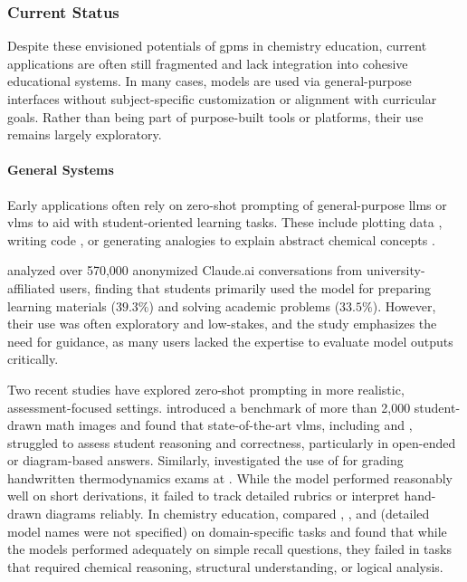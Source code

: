 \subsubsection{Current Status}

Despite these envisioned potentials of \glspl{gpm} in chemistry education, current applications are often still fragmented and lack integration into cohesive educational systems. 
In many cases, models are used via general-purpose interfaces without subject-specific customization or alignment with curricular goals. 
Rather than being part of purpose-built tools or platforms, their use remains largely exploratory.

\paragraph{General Systems}
Early applications often rely on zero-shot prompting of general-purpose \glspl{llm} or \glspl{vlm} to aid with student-oriented learning tasks. 
These include plotting data \autocite{Subasinghe2025}, writing code \autocite{Tsai2023}, or generating analogies to explain abstract chemical concepts \autocite{shao2025unlocking}. 

\textcite{handa2025education} analyzed over 570,000 anonymized Claude.ai conversations from university-affiliated users, finding that students primarily used the model for preparing learning materials ($39.3\%$) and solving academic problems ($33.5\%$). 
However, their use was often exploratory and low-stakes, and the study emphasizes the need for guidance, as many users lacked the expertise to evaluate model outputs critically.

Two recent studies have explored zero-shot prompting in more realistic, assessment-focused settings. \textcite{baral2025drawedumath0} introduced a benchmark of more than 2,000 student-drawn math images and found that state-of-the-art \glspl{vlm}, including  and , struggled to assess student reasoning and correctness, particularly in open-ended or diagram-based answers. 
Similarly, \textcite{Kortemeyer2024} investigated the use of  for grading handwritten thermodynamics exams at . While the model performed reasonably well on short derivations, it failed to track detailed rubrics or interpret hand-drawn diagrams reliably. 
In chemistry education, \textcite{kharchenko2024advantages} compared , , and  (detailed model names were not specified) on domain-specific tasks and found that while the models performed adequately on simple recall questions, they failed in tasks that required chemical reasoning, structural understanding, or logical analysis.

